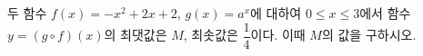 두 함수 $f(x)=-x^{2}+2x+2$, $g(x)=a^{x}$에 대하여 $0 \le x \le 3$에서 함수 $y=(g \circ f)(x)$의 최댓값은 $M$, 최솟값은 $\dfrac{1}{4}$이다. 이때 $M$의 값을 구하시오. 
